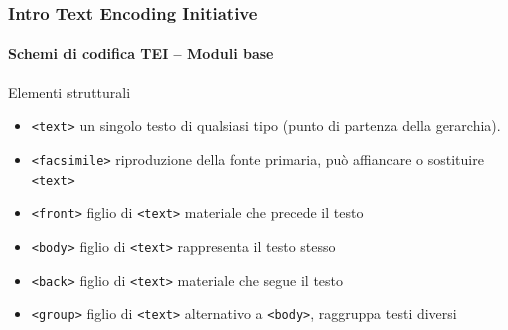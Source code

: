 \begin{frame}
	\frametitle{Intro Text Encoding Initiative}
	\framesubtitle{Schemi di codifica TEI – Moduli base}
	\addtocounter{nframe}{1}

	\begin{block}{Elementi strutturali}
        
       \begin{itemize}
           \item \texttt{<text>} un singolo testo di qualsiasi tipo (punto di partenza della gerarchia).
           \item \texttt{<facsimile>} riproduzione della fonte primaria, può affiancare o sostituire \texttt{<text>}
           \item \texttt{<front>} figlio di \texttt{<text>} materiale che precede il testo
           \item \texttt{<body>} figlio di \texttt{<text>} rappresenta il testo stesso
           \item \texttt{<back>} figlio di \texttt{<text>} materiale che segue il testo
           \item \texttt{<group>} figlio di \texttt{<text>} alternativo a \texttt{<body>}, raggruppa testi diversi
       \end{itemize}
        
    \end{block}
    
   

\end{frame}



